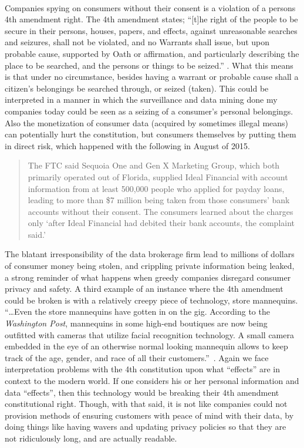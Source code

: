 \paragraph{}
Companies spying on consumers without their consent is a violation of a persons
4th amendment right. The 4th amendment states; ``[t]he right of the people to
be secure in their persons, houses, papers, and effects, against unreasonable
searches and seizures, shall not be violated, and no Warrants shall issue, but
upon probable cause, supported by Oath or affirmation, and particularly
describing the place to be searched, and the persons or things to be seized.''
\cite{cornell20164th}. What this means is that under no circumstance, besides
having a warrant or probable cause shall a citizen's belongings be searched
through, or seized (taken). This could be interpreted in
a manner in which the surveillance and data mining done my companies today
could be seen as a seizing of a consumer's personal belongings. Also the
monetization of consumer data (acquired by sometimes illegal means)
can potentially hurt the constitution, but consumers themselves
by putting them in direct risk, which happened with the following in August
of 2015.
\begin{quote}
The FTC said Sequoia One and Gen X Marketing Group, which both
primarily operated out of Florida, supplied Ideal Financial with account
information from at least 500,000 people who applied for payday loans, leading
to more than \$7 million being taken from those consumers' bank accounts
without their consent. The consumers learned about the charges only `after
Ideal Financial had debited their bank accounts, the complaint said.'~\cite{andreapeterson2015}
\end{quote}
The blatant irresponsibility of the data brokerage firm lead to millions of
dollars of consumer money being stolen, and crippling private information being
leaked, a strong reminder of what happens when greedy companies disregard
consumer privacy and safety. A third example of an instance where the 4th
amendment could be broken is with a relatively creepy piece of technology, store
mannequins. ``\ldots{}Even the store mannequins have gotten in on the gig. According
to the \textit{Washington Post}, mannequins in some high-end boutiques are now
being outfitted with cameras that utilize facial recognition technology. A small
camera embedded in the eye of an otherwise normal looking mannequin allows to
keep track of the age, gender, and race of all their customers.''~\cite{johnw.whitehead2012}.
Again we face interpretation problems with the 4th constitution upon what
``effects'' are in context to the modern world. If one considers his or her
personal information and data ``effects'', then  this technology would be
breaking their 4th amendment constitutional right. Though, with that said, it is
not like companies could not provision methods of ensuring customers with peace
of mind with their data, by doing things like having wavers and updating privacy
policies so that they are not ridiculously long, and are actually readable.
\par

